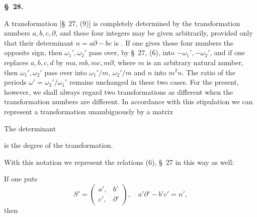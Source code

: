 
\begin{center}
\textbf{\S\ 28.\quad{}}
\end{center}

A transformation [\S\ 27, (9)] is completely determined by the transformation numbers $a, b, c, \partial$, and these four integers may be given arbitrarily, provided only that their determinant $n = a\partial - bc$ is . If one gives these four numbers the opposite sign, then $\omega_1', \omega_2'$ pass over, by \S\ 27, (6), into $-\omega_1', -\omega_2'$, and if one replaces $a, b, c, d$ by $ma, mb, mc, m\partial$, %
where $m$ is an arbitrary natural number, then $\omega_1', \omega_2'$ pass over into $\omega_1'/m$, $\omega_2'/m$ and $n$ into $m^2n$. The ratio of the periods $\omega' = \omega_2'/\omega_1'$ remains unchanged in these two cases. For the present, however, we shall always regard two transformations as different when the transformation numbers are different. In accordance with this stipulation we can represent a transformation unambiguously by a matrix


The determinant


is the degree of the transformation.

With this notation we represent the relations (6), \S\ 27 in this way as well:


If one puts
\[
S' = \begin{pmatrix} a', & b' \\ c', & \partial' \end{pmatrix}, \quad a'\partial' - b'c' = n',
\]
then


